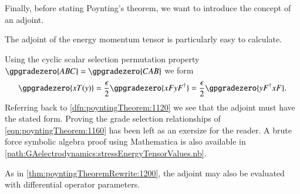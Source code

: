 Finally, before stating Poynting's theorem, we want to introduce the concept of an adjoint.

The adjoint of the energy momentum tensor is particularly easy to calculate.

Using
the cyclic scalar selection permutation property \(\gpgradezero{ABC} = \gpgradezero{CAB}\) we form
\begin{dmath}\label{eqn:poyntingTheorem:1160}
\gpgradezero{ x T(y) }
=
\frac{\epsilon}{2} \gpgradezero{ x F y F^\dagger }
=
\frac{\epsilon}{2} \gpgradezero{ y F^\dagger x F }.
\end{dmath}
Referring back to \cref{dfn:poyntingTheorem:1120} we see that the adjoint must have the stated form.
Proving the grade selection relationships of \cref{eqn:poyntingTheorem:1160} has been left as
an exersize for the reader.  A brute force symbolic algebra proof using Mathematica is also available in \cref{path:GAelectrodynamics:stressEnergyTensorValues.nb}.

As in \cref{thm:poyntingTheoremRewrite:1200},
the adjoint may also be evaluated with differential operator parameters.

